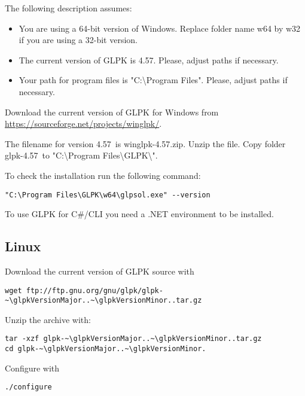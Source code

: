 \documentclass[a4paper,11pt]{report}
\newcommand{\glpkVersionMajor}{4}
\newcommand{\glpkVersionMinor}{57}
\begin{document}
The following description assumes:

\begin{itemize}
\item You are using a 64-bit version of Windows. Replace folder name w64 by w32
if you are using a 32-bit version.
\item The current version of GLPK is \glpkVersionMajor.\glpkVersionMinor.
Please, adjust paths if necessary.
\item Your path for program files is "C:\textbackslash Program Files". Please,
adjust paths if necessary.
\end{itemize}

Download the current version of GLPK for Windows from
\href{https://sourceforge.net/projects/winglpk/}{https://sourceforge.net/projects/winglpk/}.

The filename for version \glpkVersionMajor.\glpkVersionMinor\ is
winglpk-\glpkVersionMajor.\glpkVersionMinor.zip. Unzip the file. Copy folder
glpk-\glpkVersionMajor.\glpkVersionMinor\ to "C:\textbackslash Program
Files\textbackslash GLPK\textbackslash ".

To check the installation run the following command:

\begin{lstlisting}
"C:\Program Files\GLPK\w64\glpsol.exe" --version
\end{lstlisting}

To use GLPK for C\#/CLI you need a .NET environment to be installed.

\subsection{Linux}

Download the current version of GLPK source with

\begin{lstlisting}
wget ftp://ftp.gnu.org/gnu/glpk/glpk-~\glpkVersionMajor..~\glpkVersionMinor..tar.gz
\end{lstlisting}

Unzip the archive with:

\begin{lstlisting}
tar -xzf glpk-~\glpkVersionMajor..~\glpkVersionMinor..tar.gz
cd glpk-~\glpkVersionMajor..~\glpkVersionMinor.
\end{lstlisting}

Configure with

\begin{lstlisting}
./configure
\end{lstlisting}
\end{document}
